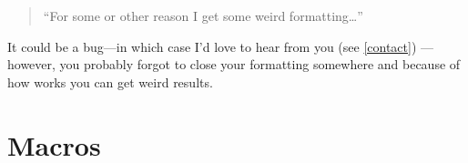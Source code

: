 \documentclass[11pt, cm-default]{l3doc}
\begin{document}
	\begin{quotation}
		``For some or other reason I get some weird formatting\dots''
	\end{quotation}

	It could be a bug---in which case I'd love to hear from you (see \ref{contact})
	---however, you probably forgot to close your formatting somewhere and because
	of how  works you can get weird results.



	
	


	\section{Macros}
\end{document}
